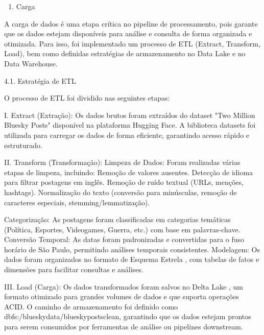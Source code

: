 \documentclass[
  letterpaper,
  DIV=11,
  numbers=noendperiod]{scrartcl}
\providecommand{\tightlist}{%
  \setlength{\itemsep}{0pt}\setlength{\parskip}{0pt}}\usepackage{longtable,booktabs,array}
\begin{document}
\begin{enumerate}
\def\labelenumi{\arabic{enumi}.}
\setcounter{enumi}{3}
\tightlist
\item
  Carga 
\end{enumerate}

A carga de dados é uma etapa crítica no pipeline de processamento, pois
garante que os dados estejam disponíveis para análise e consulta de
forma organizada e otimizada. Para isso, foi implementado um processo de
ETL (Extract, Transform, Load), bem como definidas estratégias de
armazenamento no Data Lake e no Data Warehouse.

4.1. Estratégia de ETL

O processo de ETL foi dividido nas seguintes etapas:

\begin{VerbatimWithBreaks}
I. Extract (Extração):  
    Os dados brutos foram extraídos do dataset "Two Million Bluesky Posts" disponível na plataforma Hugging Face.
    A biblioteca datasets foi utilizada para carregar os dados de forma eficiente, garantindo acesso rápido e estruturado.
     

II. Transform (Transformação):  
    Limpeza de Dados:  Foram realizadas várias etapas de limpeza, incluindo:
        Remoção de valores ausentes.
        Detecção de idioma para filtrar postagens em inglês.
        Remoção de ruído textual (URLs, menções, hashtags).
        Normalização do texto (conversão para minúsculas, remoção de caracteres especiais, stemming/lemmatização).
         
    Categorização:  As postagens foram classificadas em categorias temáticas (Política, Esportes, Videogames, Guerra, etc.) com base em palavras-chave.
    Conversão Temporal:  As datas foram padronizadas e convertidas para o fuso horário de São Paulo, permitindo análises temporais consistentes.
    Modelagem:  Os dados foram organizados no formato de Esquema Estrela , com tabelas de fatos e dimensões para facilitar consultas e análises.
     

III. Load (Carga):  
    Os dados transformados foram salvos no Delta Lake , um formato otimizado para grandes volumes de dados e que suporta operações ACID.
    O caminho de armazenamento foi definido como dbfs:/bluesky\textunderscore data/bluesky\textunderscore posts\textunderscore clean, garantindo que os dados estejam prontos para serem consumidos por ferramentas de análise ou pipelines downstream.
     
 
\end{VerbatimWithBreaks}
\end{document}
